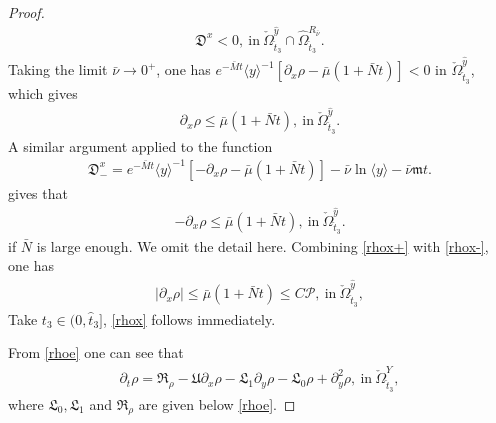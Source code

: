 \documentclass{amsart}
\numberwithin{equation}{section}
\newcommand\y{{{\langle y \rangle}}}
\begin{document}
\begin{proof}
\begin{align*}
\mathfrak{D}^{x}<0,~\text{in}~\check{\Omega}_{\hat{t}_{3}}^{\hat{y}}\cap\hat{\Omega}_{\hat{t}_{3}}^{R_{\bar{\nu}}}.
\end{align*}
Taking the limit $\bar{\nu}\to 0^{+}$, one has $e^{-\bar{M}t}\y^{-1}[\partial_{x}\rho-\bar{\mu}(1+\bar{N}t)]<0$ in $\check{\Omega}_{\hat{t}_{3}}^{\hat{y}}$,
which gives
\begin{align}\label{rhox+}
\partial_{x}\rho\leq\bar{\mu}(1+\bar{N}t), ~\text{in}~\check{\Omega}_{\hat{t}_{3}}^{\hat{y}}.
\end{align}
A similar argument applied to the function
\begin{align*}
\mathfrak{D}_{-}^{x}=e^{-\bar{M}t}\y^{-1}[-\partial_{x}\rho-\bar{\mu}(1+\bar{N}t)]-\bar{\nu}\ln\y-\bar{\nu}\mathfrak{m}t.
\end{align*}
gives that
\begin{align}\label{rhox-}
-\partial_{x}\rho\leq\bar{\mu}(1+\bar{N}t), ~\text{in}~\check{\Omega}_{\hat{t}_{3}}^{\hat{y}}.
\end{align}
if $\bar{N}$ is large enough.
We omit the detail here. Combining \eqref{rhox+} with \eqref{rhox-}, one has
\begin{align}\label{rhox'}
|\partial_{x}\rho|\leq\bar{\mu}(1+\bar{N}t)\leq C\mathcal{P}, ~\text{in}~\check{\Omega}_{\hat{t}_{3}}^{\hat{y}},
\end{align}
Take $t_{3}\in(0,\hat{t}_{3}]$, \eqref{rhox} follows immediately.

From \eqref{rhoe} one can see that
\begin{align}\label{rhoe'}
\partial_{t}\rho
= \mathfrak{R}_{\rho}
 -\mathfrak{U}\partial_{x}\rho
 -\mathfrak{L}_{1}\partial_{y}\rho
 -\mathfrak{L}_{0}\rho
 +\partial_{y}^{2}\rho,~\text{in}~\check{\Omega}_{\hat{t}_{3}}^{Y},
\end{align}
where $\mathfrak{L}_{0}, \mathfrak{L}_{1}$ and $\mathfrak{R}_{\rho}$ are given below \eqref{rhoe}.


\end{proof}
\end{document}
